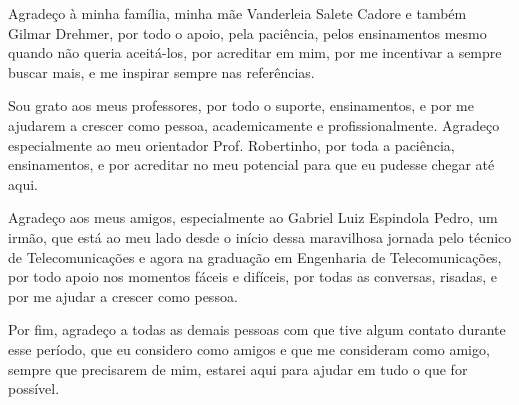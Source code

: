 \begin{agradecimentos}
    
    Agradeço à minha família, minha mãe Vanderleia Salete Cadore e também Gilmar Drehmer, por todo o apoio, pela paciência, pelos ensinamentos mesmo quando não queria aceitá-los, por acreditar em mim, por me incentivar a sempre buscar mais, e me inspirar sempre nas referências. 

    Sou grato aos meus professores, por todo o suporte, ensinamentos, e por me ajudarem a crescer como pessoa, academicamente e profissionalmente. Agradeço especialmente ao meu orientador Prof. Robertinho, por toda a paciência, ensinamentos, e por acreditar no meu potencial para que eu pudesse chegar até aqui. 

    Agradeço aos meus amigos, especialmente ao Gabriel Luiz Espindola Pedro, um irmão, que está ao meu lado desde o início dessa maravilhosa jornada pelo técnico de Telecomunicações e agora na graduação em Engenharia de Telecomunicações, por todo apoio nos momentos fáceis e difíceis, por todas as conversas, risadas, e por me ajudar a crescer como pessoa.

    Por fim, agradeço a todas as demais pessoas com que tive algum contato durante esse período, que eu considero como amigos e que me consideram como amigo, sempre que precisarem de mim, estarei aqui para ajudar em tudo o que for possível.

\end{agradecimentos}

